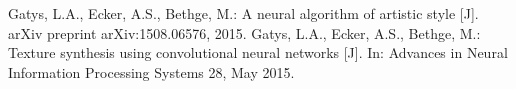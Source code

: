 \clearpage{}
{}
\begin{thebibliography}{00}

   Gatys, L.A., Ecker, A.S., Bethge, M.: A neural algorithm of artistic style [J]. arXiv preprint arXiv:1508.06576, 2015.
   Gatys, L.A., Ecker, A.S., Bethge, M.: Texture synthesis using convolutional neural networks [J]. In: Advances in Neural Information Processing Systems 28, May 2015.

\end{thebibliography}